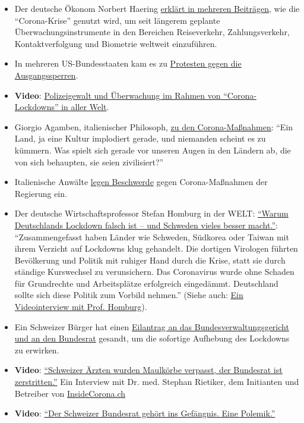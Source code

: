 \begin{itemize}
\tightlist
\item
  Der deutsche Ökonom Norbert Haering
  \href{https://norberthaering.de/}{erklärt in mehreren Beiträgen}, wie
  die ``Corona-Krise'' genutzt wird, um seit längerem geplante
  Überwachungsinstrumente in den Bereichen Reiseverkehr,
  Zahlungsverkehr, Kontaktverfolgung und Biometrie weltweit einzuführen.
\item
  In mehreren US-Bundesstaaten kam es zu
  \href{https://news.yahoo.com/protests-draw-thousands-over-state-024328374.html}{Protesten
  gegen die Ausgangssperren}.
\item
  \textbf{Video}:
  \href{https://archive.org/details/what-in-the-world-is-actually-going-on-document-reveals-plans-step-by-step}{Polizeigewalt
  und Überwachung im Rahmen von ``Corona-Lockdowns'' in aller Welt}.
\item
  Giorgio Agamben, italienischer Philosoph,
  \href{https://www.nzz.ch/feuilleton/coronavirus-giorgio-agamben-zum-zusammenbruch-der-demokratie-ld.1551896}{zu
  den Corona-Maßnahmen}: ``Ein Land, ja eine Kultur implodiert gerade,
  und niemanden scheint es zu kümmern. Was spielt sich gerade vor
  unseren Augen in den Ländern ab, die von sich behaupten, sie seien
  zivilisiert?''
\item
  Italienische Anwälte
  \href{https://www.tvprato.it/2020/04/la-camera-civile-degli-avvocati-pratesi-chiede-lannullamento-del-dpcm-del-10-aprile-e-illegittimo/}{legen
  Beschwerde} gegen Corona-Maßnahmen der Regierung ein.
\item
  Der deutsche Wirtschaftsprofessor Stefan Homburg in der WELT:
  \href{https://www.msn.com/de-de/nachrichten/coronavirus/warum-deutschlands-lockdown-falsch-ist-\%E2\%80\%93-und-schweden-vieles-besser-macht/ar-BB12E6km}{``Warum
  Deutschlands Lockdown falsch ist -- und Schweden vieles besser
  macht.''}: ``Zusammengefasst haben Länder wie Schweden, Südkorea oder
  Taiwan mit ihrem Verzicht auf Lockdowns klug gehandelt. Die dortigen
  Virologen führten Bevölkerung und Politik mit ruhiger Hand durch die
  Krise, statt sie durch ständige Kurswechsel zu verunsichern. Das
  Coronavirus wurde ohne Schaden für Grundrechte und Arbeitsplätze
  erfolgreich eingedämmt. Deutschland sollte sich diese Politik zum
  Vorbild nehmen.'' (Siehe auch:
  \href{https://www.youtube.com/watch?v=Vy-VuSRoNPQ}{Ein Videointerview
  mit Prof. Homburg}).
\item
  Ein Schweizer Bürger hat einen
  \href{https://faktenb-covid-19-massnahmen.jimdofree.com/}{Eilantrag an
  das Bundesverwaltungsgericht und an den Bundesrat} gesandt, um die
  sofortige Aufhebung des Lockdowns zu erwirken.
\item
  \textbf{Video}:
  \href{https://www.youtube.com/watch?v=eU6IdglI-wc}{``Schweizer Ärzten
  wurden Maulkörbe verpasst, der Bundesrat ist zerstritten.''} Ein
  Interview mit Dr. med. Stephan Rietiker, dem Initianten und Betreiber
  von \href{https://www.insidecorona.ch/}{InsideCorona.ch}
\item
  \textbf{Video}:
  \href{https://www.youtube.com/watch?v=SO2JMkKtq40}{``Der Schweizer
  Bundesrat gehört ins Gefängnis. Eine Polemik.''}
\end{itemize}

